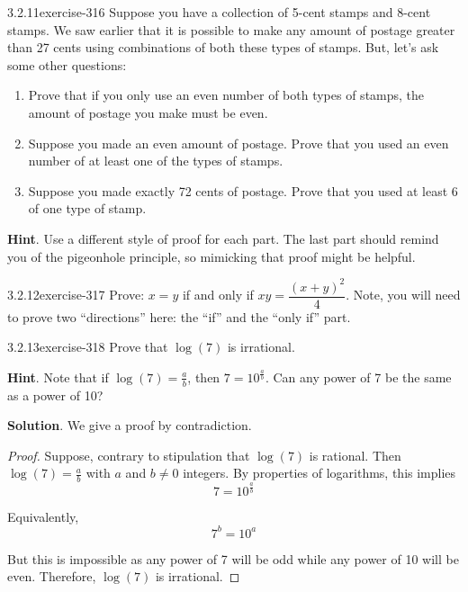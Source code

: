 \documentclass[twoside,11pt,]{book}
\numberwithin{equation}{chapter}
\begin{document}
\begin{divisionsolution}{3.2.11}{}{exercise-316}%
\hypertarget{p-4168}{}%
Suppose you have a collection of 5-cent stamps and 8-cent stamps. We saw earlier that it is possible to make any amount of postage greater than 27 cents using combinations of both these types of stamps. But, let's ask some other questions:\leavevmode%
\begin{enumerate}[label=(\alph*)]
\item\hypertarget{li-2144}{}\hypertarget{p-4169}{}%
Prove that if you only use an even number of both types of stamps, the amount of postage you make must be even.%
\item\hypertarget{li-2145}{}\hypertarget{p-4170}{}%
Suppose you made an even amount of postage. Prove that you used an even number of at least one of the types of stamps.%
\item\hypertarget{li-2146}{}\hypertarget{p-4171}{}%
Suppose you made exactly 72 cents of postage. Prove that you used at least 6 of one type of stamp.%
\end{enumerate}
%
\par\smallskip%
\noindent\textbf{Hint}.\quad%
\hypertarget{p-4172}{}%
Use a different style of proof for each part.  The last part should remind you of the pigeonhole principle, so mimicking that proof might be helpful.%
\end{divisionsolution}%
\begin{divisionsolution}{3.2.12}{}{exercise-317}%
\hypertarget{p-4173}{}%
Prove: \(x=y\) if and only if \(xy=\dfrac{(x+y)^2}{4}\). Note, you will need to prove two ``directions'' here: the ``if'' and the ``only if'' part.%
\end{divisionsolution}%
\begin{divisionsolution}{3.2.13}{}{exercise-318}%
\hypertarget{p-4174}{}%
Prove that \(\log(7)\) is irrational.%
\par\smallskip%
\noindent\textbf{Hint}.\quad%
\hypertarget{p-4175}{}%
Note that if \(\log(7) = \frac{a}{b}\), then \(7 = 10^\frac{a}{b}\).  Can any power of 7 be the same as a power of 10?%
\par\smallskip%
\noindent\textbf{Solution}.\quad%
\hypertarget{p-4176}{}%
We give a proof by contradiction.%
\begin{proof}{}
\hypertarget{p-4177}{}%
Suppose, contrary to stipulation that \(\log(7)\) is rational. Then \(\log(7) = \frac{a}{b}\) with \(a\) and \(b \ne 0\) integers. By properties of logarithms, this implies%
\begin{equation*}
7 = 10^{\frac{a}{b}}
\end{equation*}
%
\par
\hypertarget{p-4178}{}%
Equivalently,%
\begin{equation*}
7^b = 10^a
\end{equation*}
%
\par
\hypertarget{p-4179}{}%
But this is impossible as any power of 7 will be odd while any power of 10 will be even. Therefore, \(\log(7)\) is irrational.%
\end{proof}
\end{divisionsolution}%
\end{document}
